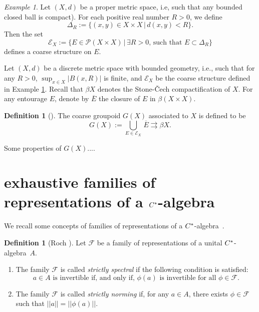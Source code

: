 \documentclass[a4paper]{amsart}
\newcommand{\tto}{\rightrightarrows}
\newcommand\Cstar{C\sp{\ast}}
\newcommand\Cstara{$\Cstar$-algebra}
\newcommand{\maE}{\mathcal E}
\newcommand{\maF}{\mathcal F}
\newcommand{\maP}{\mathcal P}
\newcommand\<{\langle}
\renewcommand\>{\rangle}
\theoremstyle{definition}
\newtheorem{defn}[theorem]{Definition}
\theoremstyle{remark}
\newtheorem{example}[theorem]{Example}
\begin{document}
\begin{example}\label{coarsestructure}
Let $(X, d)$ be a proper metric space, i.e, such that any bounded closed ball is compact). For each positive real number $R >0$, we define
$$\Delta_R:= \{(x,y) \in X \times X \, | \, d(x,y) < R \}.$$
Then the set
$$\maE_X:= \{E \in \maP(X\times X) \, | \, \exists R>0, \,\text{such that} \,\, E \subset \Delta_R  \}$$
defines a coarse structure on $E$.
\end{example}

Let $(X,d)$ be a discrete metric space with bounded geometry, i.e., such that for any $R> 0$, $\sup_{x\in X}|B(x,R)|$ is finite, and $\maE_X$ be the coarse structure defined in Example \ref{coarsestructure}.
Recall that $\beta X$ denotes the Stone-\v{C}ech compactification of $X$. For any entourage $E$, denote by $\overline{E}$
the closure of $E$ in $\beta(X\times X)$.

\begin{defn}[\cite{STY}]
The coarse groupoid $G(X)$ associated to $X$ is defined to be
$$G(X):= \bigcup\limits_{E\in \maE_X} \, \overline{E} \tto \beta X.$$
\end{defn}

Some properties of $G(X)$....\\

\bigskip

\section{exhaustive families of representations of a \Cstara}

We recall some concepts of families of representations of a \Cstara \ \cite{Exel14, NP17, Roch03}.

\begin{defn}[Roch \cite{Roch03}]
Let $\maF$ be a family of representations of a unital \Cstara \, $A$.
\begin{enumerate}
\item The family $\maF$ is called {\em strictly spectral} if the following condition is satisfied:
\begin{equation*}
a \in A\,\, \text{is invertible if, and only if,} \,\,\phi(a) \,\, \text{is invertible for all} \,\, \phi \in \maF.
\end{equation*}
\item The family $\maF$ is called {\em strictly norming} if, for any $a\in A$, there exists $\phi \in \maF$ such that
$||a||=||\phi(a)||$.
\end{enumerate}
\end{defn}
\end{document}
